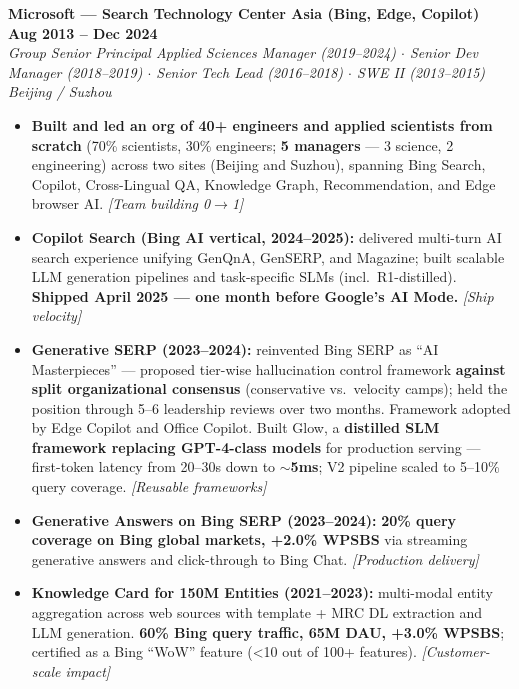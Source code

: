 \documentclass[10.5pt,letterpaper]{article}
\newcommand{\role}[4]{%
  \noindent\textbf{#1} \hfill \textbf{#3}\\
  \textit{#2} \hfill \textit{#4}\par\vspace{2pt}}
\newcommand{\lp}[1]{\textcolor{blue!55!black}{\small\textit{[#1]}}}
\begin{document}
\vspace{4pt}
\role{Microsoft --- Search Technology Center Asia (Bing, Edge, Copilot)}{Group Senior Principal Applied Sciences Manager (2019--2024) $\cdot$ Senior Dev Manager (2018--2019) $\cdot$ Senior Tech Lead (2016--2018) $\cdot$ SWE II (2013--2015)}{Aug 2013 -- Dec 2024}{Beijing / Suzhou}
\begin{itemize}
  \item \textbf{Built and led an org of 40+ engineers and applied scientists from scratch} (70\% scientists, 30\% engineers; \textbf{5 managers} — 3 science, 2 engineering) across two sites (Beijing and Suzhou), spanning Bing Search, Copilot, Cross-Lingual QA, Knowledge Graph, Recommendation, and Edge browser AI. \lp{Team building 0$\to$1}
  \item \textbf{Copilot Search (Bing AI vertical, 2024--2025):} delivered multi-turn AI search experience unifying GenQnA, GenSERP, and Magazine; built scalable LLM generation pipelines and task-specific SLMs (incl.\ R1-distilled). \textbf{Shipped April 2025 — one month before Google's AI Mode.} \lp{Ship velocity}
  \item \textbf{Generative SERP (2023--2024):} reinvented Bing SERP as ``AI Masterpieces'' — proposed tier-wise hallucination control framework \textbf{against split organizational consensus} (conservative vs.\ velocity camps); held the position through 5--6 leadership reviews over two months. Framework adopted by Edge Copilot and Office Copilot. Built Glow, a \textbf{distilled SLM framework replacing GPT-4-class models} for production serving — first-token latency from 20--30s down to \textbf{$\sim$5ms}; V2 pipeline scaled to 5--10\% query coverage. \lp{Reusable frameworks}
  \item \textbf{Generative Answers on Bing SERP (2023--2024):} \textbf{20\% query coverage on Bing global markets, +2.0\% WPSBS} via streaming generative answers and click-through to Bing Chat. \lp{Production delivery}
  \item \textbf{Knowledge Card for 150M Entities (2021--2023):} multi-modal entity aggregation across web sources with template + MRC DL extraction and LLM generation. \textbf{60\% Bing query traffic, 65M DAU, +3.0\% WPSBS}; certified as a Bing ``WoW'' feature (<10 out of 100+ features). \lp{Customer-scale impact}

\end{itemize}
\end{document}
